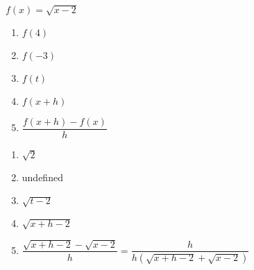 {$f(x)=\sqrt{x-2}$\\
\begin{minipage}{.5\linewidth}
\begin{enumerate}
\item $f(4)$
\item $f(-3)$
\item $f(t)$
\end{enumerate}
\end{minipage}%
\begin{minipage}{.5\linewidth}
\begin{enumerate}
\setcounter{enumi}{3}
\item $f(x+h)$
\item $\dfrac{f(x+h)-f(x)}{h}$
\end{enumerate}
\end{minipage}}
{\begin{enumerate}
\item $\sqrt2$
\item undefined
\item $\sqrt{t-2}$
\item $\sqrt{x+h-2}$
\item $\dfrac{\sqrt{x+h-2}-\sqrt{x-2}}h=\dfrac h{h(\sqrt{x+h-2}+\sqrt{x-2})}$
\end{enumerate}}
